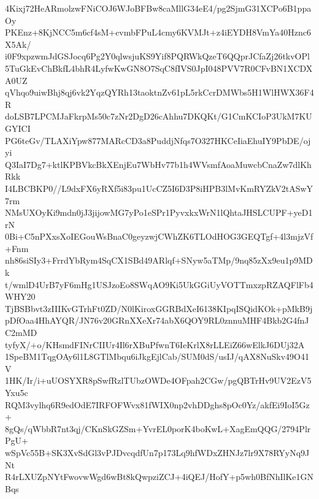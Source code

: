 4Kixj72HeARmolzwFNiCOJ6WJoBFBw8caMllG34eE4/pg2SjmG31XCPo6B1ppaOy
PKEnz+8KjNCC5m6cf4sM+cvmbFPuL4cmy6KVMJt+z4iEYDH8VmYa40Hznc6X5Ak/
i0F9xpzwmJdGSJocq6Pg2Y0qlwsjuKS9Yif8PQRWkQzeT6QQprJCfaZj26tkvOPl
5TuGkEvChBkfL4bhR4LyfwKwGN8O7SqC8fIVS0JpI048PVV7R0CFvBN1XCDXA0UZ
qVhqo9uiwBhj8qj6vk2YqzQYRh13taoktnZv61pL5rkCcrDMWbs5H1WlHWX36F4R
doLSB7LPCMJaFkrpMs50c7zNr2DgD26cAhhu7DKQKt/G1CmKCIoP3UkM7KUGYICI
PG6teGv/TLAXiYpw877MARcCD3a8PuddjNfqs7O327HKCeIiaEhuIY9PbDE/ojyi
Q3IaI7Dg7+ktlKPBVkcBkXEnjEu7WbHv77b1h4WVsmfAoaMuwcbCnaZw7dlKhRkk
I4LBCBKP0//L9dxFX6yRXf5i83pu1UcCZ5I6D3P8iHPB3lMvKmRYZkV2tASwY7rm
NMsUXOyKi9mdn0jJ3jijowMG7yPo1eSPr1PyvxkxWrN1lQhtaJHSLCUPF+yeD1rN
0Bi+C5nPXxsXoIEGouWsBnaC0geyzwjCWhZK6TLOdHOG3GEQTgf+4l3mjzVf+Fnm
nh86siSIy3+FrrdYbRym4SqCX1SBd49ARlqf+SNyw5aTMp/9nq85zXx9eu1p9MDk
t/wmlD4UrB7yF6mHg1USJzoEo8SWqAO9Ki5UkGGiUyVOTTmxzpRZAQFlFb4WHY20
TjBSBbvt3zIIIKvGTrhFt0ZD/N0lKiroxGGRBdXeI6138KIpqISQidKOk+pMkB9j
pDfOaa4HhAYQR/JN76v20GRnXXeXr74abX6QOY9RL0znnuMHF4Bkb2G4fnJC2mMD
tyfyX/+o/KHsmdFINrCIIUr4Il6rXBuPfwnT6IeKrlX8rLLEiZ66wElkJ6DUj32A
1SpeBM1TqgOAy6l1L8GTlMbqu6iJkgEjlCab/SUM0dS/usIJ/qAX8NuSkv49O41V
1HK/Ir/i+uUOSYXR8pSwfRzlTUbzOWDe4OFpah2CGw/pgQBTrHv9UV2EzV5Yxu5c
RQM3vylhq6R9edOdE7IRFOFWvx81fWIX0np2vhDDghs8pOc0Yz/akfEi9IoI5Gz+
8gQs/qWbbR7nt3qj/CKnSkGZSm+YvrEL0porK4boKwL+XagEmQQG/2794PlrPgU+
wSpVc55B+SK3XvSdGl3vPJDvcqdfUn7p173Lq9hfWDxZHNJz7lr9X78RYyNq9JNt
R4rLXUZpNYtFwovwWgd6wBt8kQwpziZCJ+4iQEJ/HofY+p5wh0BfNhIlKe1GNBqs
